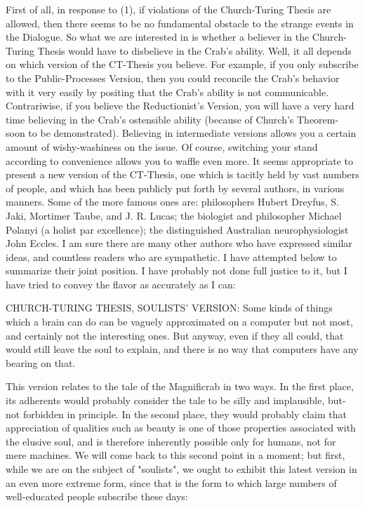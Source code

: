 {First of all, in response to (1), if violations of the Church-Turing Thesis are allowed, then
there seems to be no fundamental obstacle to the strange events in the Dialogue. So what
we are interested in is whether a believer in the Church-Turing Thesis would have to
disbelieve in the Crab's ability. Well, it all depends on which version of the CT-Thesis
you believe. For example, if you only subscribe to the Public-Processes Version, then you
could reconcile the Crab's behavior with it very easily by positing that the Crab's ability is
not communicable. Contrariwise, if you believe the Reductionist's Version, you will have
a very hard time believing in the Crab's ostensible ability (because of Church's Theorem-
soon to be demonstrated). Believing in intermediate versions allows you a certain amount
of wishy-washiness on the issue. Of course, switching your stand according to
convenience allows you to waffle even more.
        It seems appropriate to present a new version of the CT-Thesis, one which is
tacitly held by vast numbers of people, and which has been publicly put forth by several
authors, in various manners. Some of the more famous ones are: philosophers Hubert
Dreyfus, S. Jaki, Mortimer Taube, and J. R. Lucas; the biologist and philosopher Michael
Polanyi (a holist par excellence); the distinguished Australian neurophysiologist John
Eccles. I am sure there are many other authors who have expressed similar ideas, and
countless readers who are sympathetic. I have attempted below to summarize their joint
position. I have probably not done full justice to it, but I have tried to convey the flavor as
accurately as I can:

   CHURCH-TURING THESIS, SOULISTS' VERSION: Some kinds of things which
     a brain can do can be vaguely approximated on a computer but not most, and
     certainly not the interesting ones. But anyway, even if they all could, that would
     still leave the soul to explain, and there is no way that computers have any
     bearing on that.

This version relates to the tale of the Magnificrab in two ways. In the first place, its
adherents would probably consider the tale to be silly and implausible, but-not forbidden
in principle. In the second place, they would probably claim that appreciation of qualities
such as beauty is one of those properties associated with the elusive soul, and is therefore
inherently possible only for humans, not for mere machines.
        We will come back to this second point in a moment; but first, while we are on
the subject of "soulists", we ought to exhibit this latest version in an even more extreme
form, since that is the form to which large numbers of well-educated people subscribe
these days:

}
